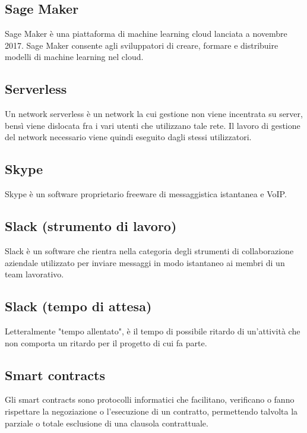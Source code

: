 
\subsection*{Sage Maker}
Sage Maker è una piattaforma di machine learning cloud lanciata a novembre 2017. Sage Maker consente agli sviluppatori di creare, formare e distribuire modelli di machine learning nel cloud.

\subsection*{Serverless}
Un network serverless è un network la cui gestione non viene incentrata su server, bensì viene dislocata fra i vari utenti che utilizzano tale rete. Il lavoro di gestione del network necessario viene quindi eseguito dagli stessi utilizzatori.

\subsection*{Skype}
Skype è un software proprietario freeware di messaggistica istantanea e VoIP.

\subsection*{Slack (strumento di lavoro)}
Slack è un software che rientra nella categoria degli strumenti di collaborazione aziendale utilizzato per inviare messaggi in modo istantaneo ai membri di un team lavorativo.

\subsection*{Slack (tempo di attesa)}
Letteralmente "tempo allentato", è il tempo di possibile ritardo di un’attività che non comporta
un ritardo per il progetto di cui fa parte.

\subsection*{Smart contracts}
Gli smart contracts sono protocolli informatici che facilitano, verificano o fanno rispettare la negoziazione o l'esecuzione di un contratto, permettendo talvolta la parziale o totale esclusione di una clausola contrattuale.


